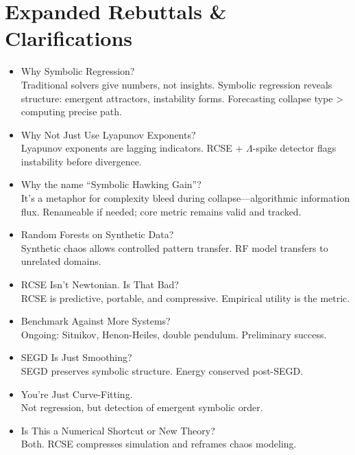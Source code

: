 \documentclass[12pt]{article}
\begin{document}
\section*{Expanded Rebuttals \& Clarifications}

\begin{itemize}
\item Why Symbolic Regression?\\
Traditional solvers give numbers, not insights. Symbolic regression reveals structure: emergent attractors, instability forms. Forecasting collapse type > computing precise path.

\item Why Not Just Use Lyapunov Exponents?\\
Lyapunov exponents are lagging indicators. RCSE + \( \Lambda \)-spike detector flags instability before divergence.

\item Why the name ``Symbolic Hawking Gain''?\\
It's a metaphor for complexity bleed during collapse---algorithmic information flux. Renameable if needed; core metric remains valid and tracked.

\item Random Forests on Synthetic Data?\\
Synthetic chaos allows controlled pattern transfer. RF model transfers to unrelated domains.

\item RCSE Isn’t Newtonian. Is That Bad?\\
RCSE is predictive, portable, and compressive. Empirical utility is the metric.

\item Benchmark Against More Systems?\\
Ongoing: Sitnikov, Henon-Heiles, double pendulum. Preliminary success.

\item SEGD Is Just Smoothing?\\
SEGD preserves symbolic structure. Energy conserved post-SEGD.

\item You’re Just Curve-Fitting.\\
Not regression, but detection of emergent symbolic order.

\item Is This a Numerical Shortcut or New Theory?\\
Both. RCSE compresses simulation and reframes chaos modeling.


\end{itemize}
\end{document}
